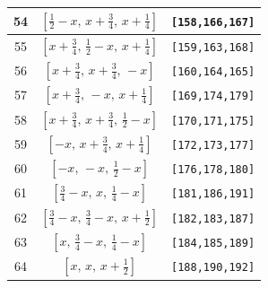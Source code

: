 \documentclass[fleqn,8pt]{jsarticle}
\begin{document}
\begin{longtable}{ccc}
54 & $\left[ \frac{1}{2} - x,\, x + \frac{3}{4},\, x + \frac{1}{4} \right]$ & {\tt [158,166,167]} \\ \hline
55 & $\left[ x + \frac{3}{4},\, \frac{1}{2} - x,\, x + \frac{1}{4} \right]$ & {\tt [159,163,168]} \\ \hline
56 & $\left[ x + \frac{3}{4},\, x + \frac{3}{4},\, - x \right]$ & {\tt [160,164,165]} \\ \hline
57 & $\left[ x + \frac{3}{4},\, - x,\, x + \frac{1}{4} \right]$ & {\tt [169,174,179]} \\ \hline
58 & $\left[ x + \frac{3}{4},\, x + \frac{3}{4},\, \frac{1}{2} - x \right]$ & {\tt [170,171,175]} \\ \hline
59 & $\left[ - x,\, x + \frac{3}{4},\, x + \frac{1}{4} \right]$ & {\tt [172,173,177]} \\ \hline
60 & $\left[ - x,\, - x,\, \frac{1}{2} - x \right]$ & {\tt [176,178,180]} \\ \hline
61 & $\left[ \frac{3}{4} - x,\, x,\, \frac{1}{4} - x \right]$ & {\tt [181,186,191]} \\ \hline
62 & $\left[ \frac{3}{4} - x,\, \frac{3}{4} - x,\, x + \frac{1}{2} \right]$ & {\tt [182,183,187]} \\ \hline
63 & $\left[ x,\, \frac{3}{4} - x,\, \frac{1}{4} - x \right]$ & {\tt [184,185,189]} \\ \hline
64 & $\left[ x,\, x,\, x + \frac{1}{2} \right]$ & {\tt [188,190,192]} \\
\end{longtable}
\renewcommand{\arraystretch}{1.2}
\end{document}
